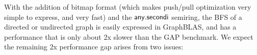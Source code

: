 

With the addition of bitmap format (which makes push/pull optimization very
simple to express, and very fast) and the $\mathbin{\mathsf{any.secondi}}$ %
semiring, the BFS of a
directed or undirected graph is easily expressed in GraphBLAS, and has a
performance that is only about 2x slower than the GAP benchmark.  We expect
the remaining 2x performance gap arises from two issues:

